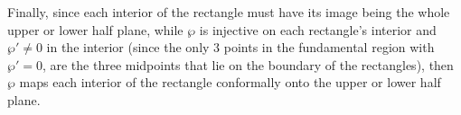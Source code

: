 \documentclass{article}
\begin{document}
\begin{itemize}
    \hfil

    Finally, since each interior of the rectangle must have its image being the whole upper or lower half plane, while $\wp$ is injective on each rectangle's interior and $\wp' \neq 0$ in the interior (since the only $3$ points in the fundamental region with $\wp'=0$, are the three midpoints that lie on the boundary of the rectangles), then $\wp$ maps each interior of the rectangle conformally onto the upper or lower half plane.
\end{itemize}
\end{document}
